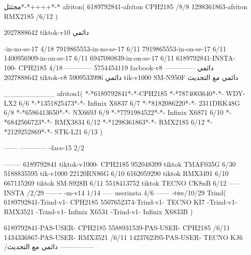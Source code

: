 مجثثل*-*++++*-*
afriton(
6189792841-afriton CPH2185  /8/8
1298361863-afriton RMX2185  /6/12
)

2027888642 tiktok-v10
دائمي

-in-no-se-17 4/18
7919865553-in-no-se-17 6/11
7919865553-in-on-se-17 6/11
1400956909-in-on-se-17 6/11
6947080839-in-on-se-17 6/11
6189792841-INSTA-100- CPH2185 4/18
------------
5754454119 facbook-v8
دائمي
--------------
2027888642 tiktok-v8
دائمي
5909533996 tik-v1000  SM-N950F
دائمي مع التحديث

__________
afriton1(
*-*6189792841*-*-CPH2185
*-*7874003640*-*- WDY-LX2  6/6
*-*1351825473*-*- Infinix X6837  6/7
*-*8182086220*-*- 2311DRK48G  6/8
*-*6586413650*-*- NX669J  6/9
*-*7791984522*-*- Infinix X6871  6/10
*-*6842566723*-*- RMX3834  6/12
*-*1298361863*-*- RMX2185  6/12
*-*2129252869*-*- STK-L21  6/13
)


------
------------
-face-15 2/2

--------
6189792841 tiktok-v1000- CPH2185 
952048399 tiktok TMAF035G  6/30
5188835595 tik-v1000 22120RN86G  6/10
6162059290 tiktok RMX3491  6/10
667115269 tiktok  SM-S928B  6/11
5518413752 tiktok  TECNO CK8nB  6/12
-----
 INSTA /2/29
-------
-m-v14 1/14
-----
userinsta 4/6
------
-twe/10/29
Trind(
6189792841-Trind-v1- CPH2185 
5507652374-Trind-v1- TECNO KI7 \6-Trind-v1- RMX3521 \6-Trind-v1-  Infinix X6531 \6-Trind-v1-   Infinix X6833B \6
)


6189792841-PAS-USER- CPH2185 
5588931539-PAS-USER- CPH2185  /6/11
1434336867-PAS-USER- RMX3521  /6/11
1423762395-PAS-USER- TECNO KJ6  /دائمي مع التحديث
    ---------------
